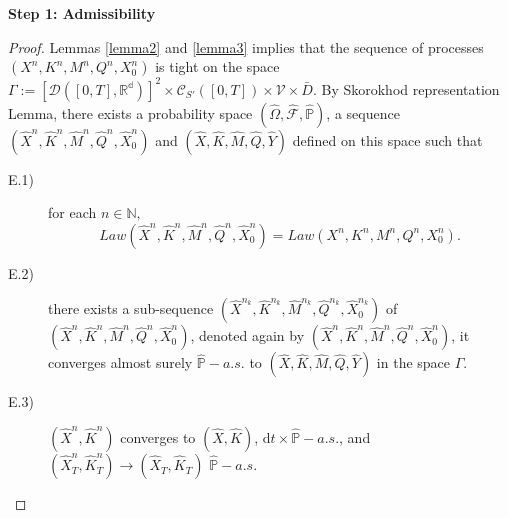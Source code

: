 \documentclass[11pt,amsfonts]{article}
\theoremstyle{plain}
\theoremstyle{assumpstyle}
\numberwithin{equation}{section}
\numberwithin{theorem}{section}
\numberwithin{proposition}{section}
\numberwithin{definition}{section}
\numberwithin{remark}{section}
\numberwithin{corollary}{section}
\numberwithin{lemma}{section}
\begin{document}
\noindent \textbf{Step 1: Admissibility} 
 
\begin{proof}
Lemmas \ref{lemma2} and  \ref{lemma3} implies that the sequence of processes $(X^n, K^n, M^n, Q^n, X^n_0)$ is tight on the space $\Gamma:= [\mathcal{D}([0,T], \mathbb{R^d})]^2 \times \mathcal{C}_{S'}([0,T]) \times \mathcal{V} \times \bar{D}$.
By Skorokhod representation Lemma, there exists a probability space $(\hat{\Omega},\hat{\mathcal{F}}, \hat{\mathbb{P}})$, a sequence $(\hat{X}^n, \hat{K}^n, \hat{M}^n, \hat{Q}^n, \hat{X}^n_0)$ and $(\hat{X}, \hat{K}, \hat{M}, \hat{Q}, \hat{Y})$ defined on this space such that 
\begin{description}
\item[E.1)] for each $n \in \mathbb{N},$
\begin{equation}
Law(\hat{X}^n, \hat{K}^n, \hat{M}^n, \hat{Q}^n, \hat{X}^n_0) = Law(X^n, K^n, M^n, Q^n, X^n_0).
\end{equation}
\item[E.2)] \label{eq:E.2}
there exists a sub-sequence $(\hat{X}^{n_k}, \hat{K}^{n_k}, \hat{M}^{n_k}, \hat{Q}^{n_k}, \hat{X}^{n_k}_0)$ of $(\hat{X}^n, \hat{K}^n, \hat{M}^n, \hat{Q}^n, \hat{X}^n_0)$, denoted again by $(\hat{X}^n, \hat{K}^n, \hat{M}^n, \hat{Q}^n, \hat{X}^n_0)$, it converges almost surely $\hat{\mathbb{P}}-a.s.$ to $(\hat{X}, \hat{K}, \hat{M}, \hat{Q}, \hat{Y})$ in the space $\Gamma$.
\item[E.3)] $(\hat{X}^n, \hat{K}^n)$ converges to $(\hat{X}, \hat{K})$, $\mathrm{d}t\times \hat{\mathbb{P}}-a.s.$, and $(\hat{X}^n_T, \hat{K}^n_T) \to (\hat{X}_T, \hat{K}_T)$ $\hat{\mathbb{P}}-a.s.$
\end{description}



\end{proof}
\end{document}
